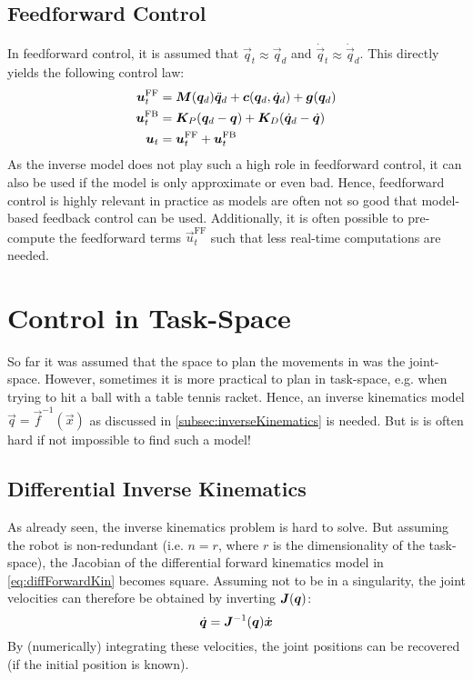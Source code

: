 		\subsection{Feedforward Control}
			In feedforward control, it is assumed that \( \vec{q}_t \approx \vec{q}_d \) and \( \dot{\vec{q}}_t \approx \dot{\vec{q}}_d \). This directly yields the following control law:
			\begin{align*}
				\bm{u}_t^\mathrm{FF} &= \bm{M}(\bm{q}_d) \ddot{\bm{q}}_d + \bm{c}(\bm{q}_d, \dot{\bm{q}}_d) + \bm{g}(\bm{q}_d) \\
				\bm{u}_t^\mathrm{FB} &= \bm{K}_P (\bm{q}_d - \bm{q}) + \bm{K}_D (\dot{\bm{q}}_d - \dot{\bm{q}}) \\
				\bm{u}_t &= \bm{u}_t^\mathrm{FF} + \bm{u}_t^\mathrm{FB}
			\end{align*}
			As the inverse model does not play such a high role in feedforward control, it can also be used if the model is only approximate or even bad. Hence, feedforward control is highly relevant in practice as models are often not so good that model-based feedback control can be used. Additionally, it is often possible to pre-compute the feedforward terms \( \vec{u}_t^\mathrm{FF} \) such that less real-time computations are needed.

	\section{Control in Task-Space}
		So far it was assumed that the space to plan the movements in was the joint-space. However, sometimes it is more practical to plan in task-space, e.g. when trying to hit a ball with a table tennis racket. Hence, an inverse kinematics model \( \vec{q} = \vec{f}^{-1}(\vec{x}) \) as discussed in \autoref{subsec:inverseKinematics} is needed. But is is often hard if not impossible to find such a model!

		\subsection{Differential Inverse Kinematics}
			As already seen, the inverse kinematics problem is hard to solve. But assuming the robot is non-redundant (i.e. \( n = r \), where \(r\) is the dimensionality of the task-space), the Jacobian of the differential forward kinematics model in \eqref{eq:diffForwardKin} becomes square. Assuming not to be in a singularity, the joint velocities can therefore be obtained by inverting \( \bm{J}(\bm{q}) \):
			\begin{equation*}
				\dot{\bm{q}} = \bm{J}^{-1}(\bm{q}) \dot{\bm{x}}
			\end{equation*}
			By (numerically) integrating these velocities, the joint positions can be recovered (if the initial position is known).

